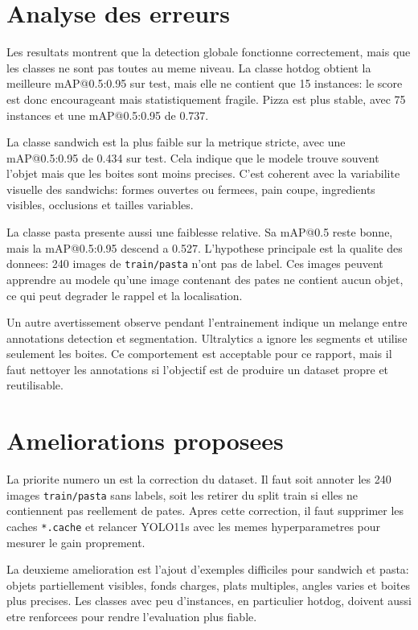 \documentclass[11pt,a4paper]{article}
\begin{document}
\section{Analyse des erreurs}
Les resultats montrent que la detection globale fonctionne correctement, mais que
les classes ne sont pas toutes au meme niveau. La classe hotdog obtient la meilleure
mAP@0.5:0.95 sur test, mais elle ne contient que 15 instances: le score est donc
encourageant mais statistiquement fragile. Pizza est plus stable, avec 75 instances
et une mAP@0.5:0.95 de 0.737.

La classe sandwich est la plus faible sur la metrique stricte, avec une
mAP@0.5:0.95 de 0.434 sur test. Cela indique que le modele trouve souvent l'objet
mais que les boites sont moins precises. C'est coherent avec la variabilite visuelle
des sandwichs: formes ouvertes ou fermees, pain coupe, ingredients visibles,
occlusions et tailles variables.

La classe pasta presente aussi une faiblesse relative. Sa mAP@0.5 reste bonne, mais
la mAP@0.5:0.95 descend a 0.527. L'hypothese principale est la qualite des donnees:
240 images de \texttt{train/pasta} n'ont pas de label. Ces images peuvent apprendre
au modele qu'une image contenant des pates ne contient aucun objet, ce qui peut
degrader le rappel et la localisation.

Un autre avertissement observe pendant l'entrainement indique un melange entre
annotations detection et segmentation. Ultralytics a ignore les segments et utilise
seulement les boites. Ce comportement est acceptable pour ce rapport, mais il faut
nettoyer les annotations si l'objectif est de produire un dataset propre et
reutilisable.

\section{Ameliorations proposees}
La priorite numero un est la correction du dataset. Il faut soit annoter les 240
images \texttt{train/pasta} sans labels, soit les retirer du split train si elles ne
contiennent pas reellement de pates. Apres cette correction, il faut supprimer les
caches \texttt{*.cache} et relancer YOLO11s avec les memes hyperparametres pour
mesurer le gain proprement.

La deuxieme amelioration est l'ajout d'exemples difficiles pour sandwich et pasta:
objets partiellement visibles, fonds charges, plats multiples, angles varies et
boites plus precises. Les classes avec peu d'instances, en particulier hotdog,
doivent aussi etre renforcees pour rendre l'evaluation plus fiable.
\end{document}
